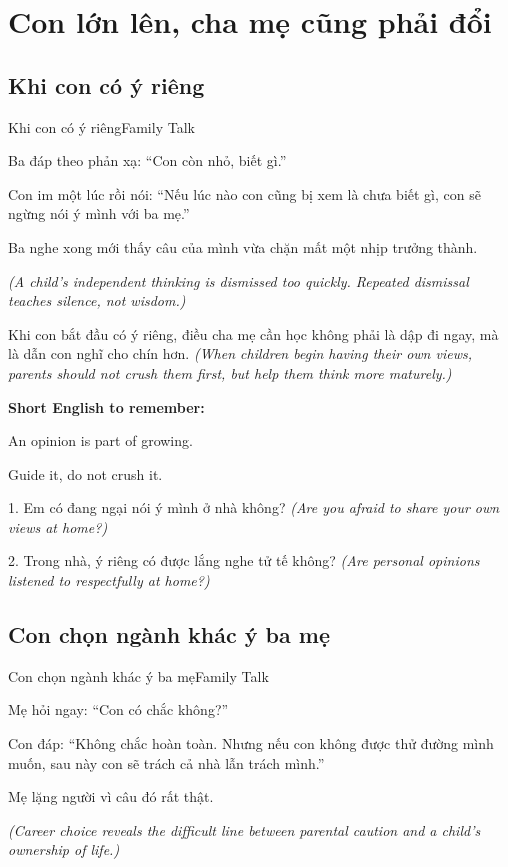 \chapter{Con lớn lên, cha mẹ cũng phải đổi}

\section{Khi con có ý riêng}
\begin{truyen}{Khi con có ý riêng}{Family Talk}

Ba đáp theo phản xạ: ``Con còn nhỏ, biết gì.''

Con im một lúc rồi nói: ``Nếu lúc nào con cũng bị xem là chưa biết gì, con sẽ ngừng nói ý mình với ba mẹ.''

Ba nghe xong mới thấy câu của mình vừa chặn mất một nhịp trưởng thành.

\textit{(A child's independent thinking is dismissed too quickly. Repeated dismissal teaches silence, not wisdom.)}
\end{truyen}

\begin{baihoc}
Khi con bắt đầu có ý riêng, điều cha mẹ cần học không phải là dập đi ngay, mà là dẫn con nghĩ cho chín hơn.
\textit{(When children begin having their own views, parents should not crush them first, but help them think more maturely.)}
\end{baihoc}

\begin{ghinhoanh}
\textbf{Short English to remember:}

An opinion is part of growing.

Guide it, do not crush it.
\end{ghinhoanh}

\begin{tuhocnhanh}
1. Em có đang ngại nói ý mình ở nhà không? \textit{(Are you afraid to share your own views at home?)}

2. Trong nhà, ý riêng có được lắng nghe tử tế không? \textit{(Are personal opinions listened to respectfully at home?)}
\end{tuhocnhanh}
\ngancach

\section{Con chọn ngành khác ý ba mẹ}
\begin{truyen}{Con chọn ngành khác ý ba mẹ}{Family Talk}

Mẹ hỏi ngay: ``Con có chắc không?''

Con đáp: ``Không chắc hoàn toàn. Nhưng nếu con không được thử đường mình muốn, sau này con sẽ trách cả nhà lẫn trách mình.''

Mẹ lặng người vì câu đó rất thật.

\textit{(Career choice reveals the difficult line between parental caution and a child's ownership of life.)}
\end{truyen}

